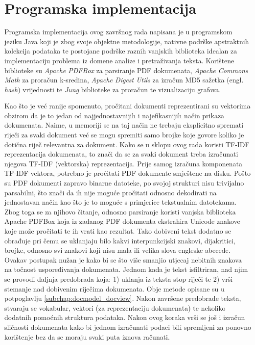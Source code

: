 \documentclass[times, utf8, zavrsni]{fer}
\begin{document}
\chapter{Programska implementacija}
\label{chap:impl}
Programska implementacija ovog završnog rada napisana je u programskom jeziku Java koji je zbog svoje objektne metodologije, nativne podrške apstraktnih kolekcija podataka te postojane podrške raznih vanjskih biblioteka idealan za implementaciju problema iz domene analize i pretraživanja teksta.
Korištene biblioteke su \textit{Apache PDFBox} za parsiranje PDF dokumenata, \textit{Apache Commons Math} za proračun k-sredina, \textit{Apache Digest Utils} za izračun MD5 sažetka (engl. \textit{hash}) vrijednosti te \textit{Jung} biblioteke za proračun te vizualizaciju grafova. \par
Kao što je već ranije spomenuto, pročitani dokumenti reprezentirani su vektorima obzirom da je to jedan od  najjednostavnijih i najefikasnijih način prikaza dokumenata. Naime, u memoriji se na taj način ne trebaju eksplicitno spremati riječi za svaki dokument već se mogu spremiti samo brojke koje govore koliko je dotična riječ relevantna za dokument. Kako se u sklopu ovog rada koristi TF-IDF reprezentacija dokumenata, to znači da se za svaki dokument treba izračunati njegova TF-IDF (vektorska) reprezentacija. Prije samog izračuna komponenata TF-IDF vektora, potrebno je pročitati PDF dokumente smještene na disku. Pošto su PDF dokumenti zapravo binarne datoteke, po svojoj strukturi nisu trivijalno parsabilni, što znači da ih nije moguće pročitati odnosno dekodirati na jednostavan način kao što je to moguće s primjerice tekstualnim datotekama. Zbog toga se za njihovo čitanje, odnosno parsiranje koristi vanjska biblioteka Apache PDFBox koja iz zadanog PDF dokumenta ekstrahira Unicode znakove koje može pročitati te ih vrati kao rezultat. Tako dobiveni tekst dodatno se obrađuje pri čemu se uklanjaju bilo kakvi interpunkcijski znakovi, dijakritici, brojke, odnosno svi znakovi koji nisu mala ili velika slova engleske abecede. Ovakav postupak nužan je kako bi se što više smanjio utjecaj nebitnih znakova na točnost uspoređivanja dokumenata.
Jednom kada je tekst isfiltriran, nad njim se provodi daljnja predobrada koja: 1) uklanja iz teksta stop-riječi te 2) vrši stemanje nad dobivenim riječima dokumenata. Obje metode opisane su u potpoglavlju
\ref{subchap:docmodel_docview}. Nakon završene predobrade teksta, stvaraju se vokabular, vektori (za reprezentaciju dokumenata) te nekoliko dodatnih pomoćnih struktura podataka. Nakon ovog koraka vrši se još i izračun sličnosti dokumenata kako bi jednom izračunati podaci bili spremljeni za ponovno korištenje bez da se moraju svaki puta iznova računati.
\end{document}
